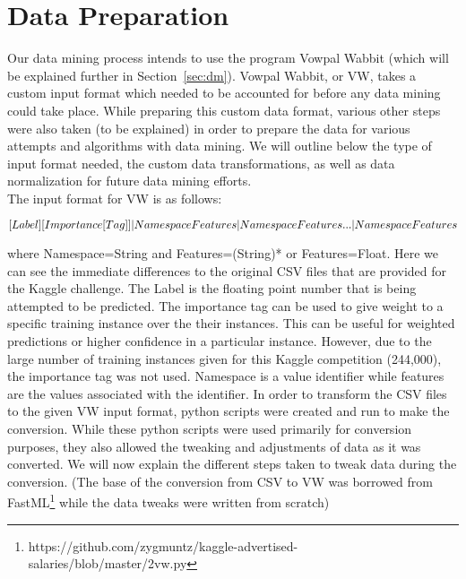 \section{Data Preparation}

Our data mining process intends to use the program Vowpal Wabbit (which will be explained further in Section~\ref{sec:dm}). Vowpal Wabbit,
or VW, takes a custom input format which needed to be accounted for before any data mining could take place. While preparing this custom
data format, various other steps were also taken (to be explained) in order to prepare the data for various attempts and algorithms with
data mining. We will outline below the type of input format needed, the custom data transformations, as well as data normalization for
future data mining efforts.\\

The input format for VW is as follows:

\begin{equation}
\label{eq:input}
\tiny
[Label][Importance [Tag]]|Namespace Features|Namespace Features...|Namespace Features
\end{equation}

where Namespace=String and Features=(String)* or Features=Float. Here we can see the immediate differences to the original CSV files that
are provided for the Kaggle challenge. The Label is the floating point number that is being attempted to be predicted. The importance
tag can be used to give weight to a specific training instance over the their instances. This can be useful for weighted predictions
or higher confidence in a particular instance. However, due to the large number of training instances given for this Kaggle competition
(244,000), the importance tag was not used. Namespace is a value identifier while features are the values associated with the identifier.
In order to transform the CSV files to the given VW input format, python scripts were created and run to make the conversion. While
these python scripts were used primarily for conversion purposes, they also allowed the tweaking and adjustments of data as it was converted.
We will now explain the different steps taken to tweak data during the conversion. (The base of the conversion from CSV to VW was
borrowed from FastML\footnote{https://github.com/zygmuntz/kaggle-advertised-salaries/blob/master/2vw.py} while the data tweaks were
written from scratch)\\

